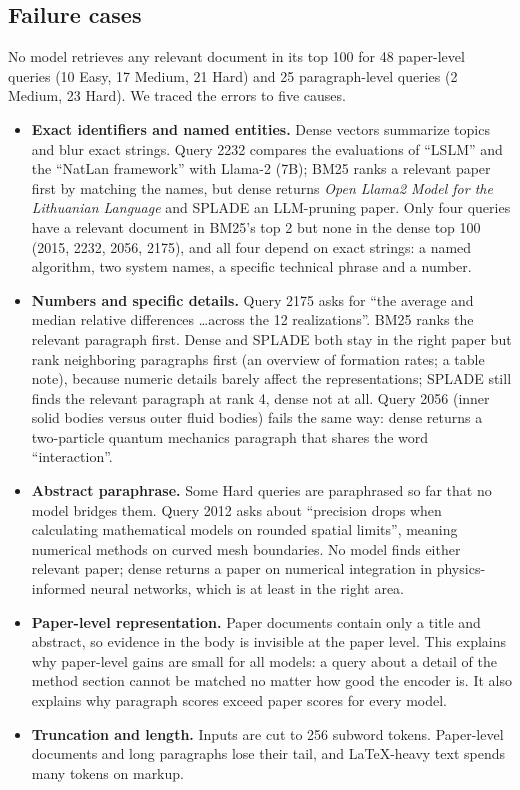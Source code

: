 \documentclass[sigconf,nonacm]{acmart}
\begin{document}
\subsection{Failure cases}
No model retrieves any relevant document in its top 100 for 48 paper-level queries (10 Easy, 17 Medium, 21 Hard) and 25 paragraph-level queries (2 Medium, 23 Hard). We traced the errors to five causes.
\begin{itemize}
\item \textbf{Exact identifiers and named entities.} Dense vectors summarize topics and blur exact strings. Query 2232 compares the evaluations of ``LSLM'' and the ``NatLan framework'' with Llama-2 (7B); BM25 ranks a relevant paper first by matching the names, but dense returns \emph{Open Llama2 Model for the Lithuanian Language} and SPLADE an LLM-pruning paper. Only four queries have a relevant document in BM25's top 2 but none in the dense top 100 (2015, 2232, 2056, 2175), and all four depend on exact strings: a named algorithm, two system names, a specific technical phrase and a number.
\item \textbf{Numbers and specific details.} Query 2175 asks for ``the average and median relative differences \ldots across the 12 realizations''. BM25 ranks the relevant paragraph first. Dense and SPLADE both stay in the right paper but rank neighboring paragraphs first (an overview of formation rates; a table note), because numeric details barely affect the representations; SPLADE still finds the relevant paragraph at rank 4, dense not at all. Query 2056 (inner solid bodies versus outer fluid bodies) fails the same way: dense returns a two-particle quantum mechanics paragraph that shares the word ``interaction''.
\item \textbf{Abstract paraphrase.} Some Hard queries are paraphrased so far that no model bridges them. Query 2012 asks about ``precision drops when calculating mathematical models on rounded spatial limits'', meaning numerical methods on curved mesh boundaries. No model finds either relevant paper; dense returns a paper on numerical integration in physics-informed neural networks, which is at least in the right area.
\item \textbf{Paper-level representation.} Paper documents contain only a title and abstract, so evidence in the body is invisible at the paper level. This explains why paper-level gains are small for all models: a query about a detail of the method section cannot be matched no matter how good the encoder is. It also explains why paragraph scores exceed paper scores for every model.
\item \textbf{Truncation and length.} Inputs are cut to 256 subword tokens. Paper-level documents and long paragraphs lose their tail, and LaTeX-heavy text spends many tokens on markup.
\end{itemize}
\end{document}
